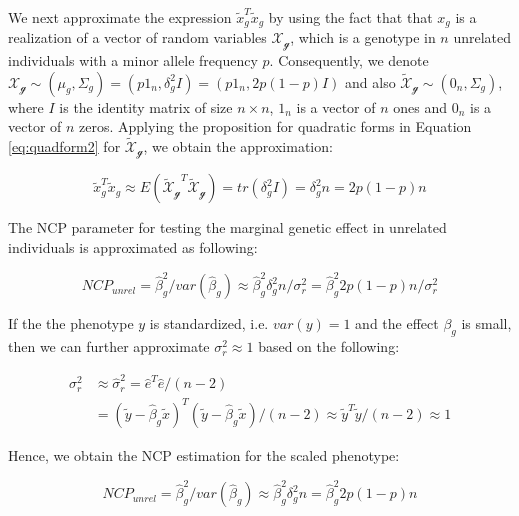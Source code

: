 \documentclass[]{book}
\theoremstyle{definition}
\theoremstyle{definition}
\theoremstyle{definition}
\theoremstyle{remark}
\begin{document}
We next approximate the expression \(\tilde{x}_g^T \tilde{x}_g\) by
using the fact that that \(x_g\) is a realization of a vector of random
variables \(\mathcal{X_g}\), which is a genotype in \(n\) unrelated
individuals with a minor allele frequency \(p\). Consequently, we denote
\(\mathcal{X_g} \sim (\mu_g, \Sigma_g) = (p 1_n, \delta_g^2 I) = (p 1_n, 2 p (1-p) I)\)
and also \(\mathcal{\tilde{X}_g} \sim (0_n, \Sigma_g)\), where \(I\) is
the identity matrix of size \(n \times n\), \(1_n\) is a vector of \(n\)
ones and \(0_n\) is a vector of \(n\) zeros. Applying the proposition
for quadratic forms in Equation \eqref{eq:quadform2} for
\(\mathcal{\tilde{X}_g}\), we obtain the approximation:

\begin{equation} 
\tilde{x}_g^T \tilde{x}_g \approx E(\mathcal{\tilde{X}_g}^T \mathcal{\tilde{X}_g}) = tr(\delta_g^2 I) = \delta_g^2 n = 2 p (1 - p) n
\label{eq:varbetahatlmg}
\end{equation}

The NCP parameter for testing the marginal genetic effect in unrelated
individuals is approximated as following:

\begin{equation} 
NCP_{unrel} = \hat{\beta}_g^2 / var(\hat{\beta}_g) \approx \hat{\beta}_g^2 \delta_g^2 n / \sigma_r^2 = \hat{\beta}_g^2 2 p (1 - p) n / \sigma_r^2
\label{eq:ncplmg}
\end{equation}

If the the phenotype \(y\) is standardized, i.e. \(var(y) = 1\) and the
effect \(\beta_g\) is small, then we can further approximate
\(\sigma_r^2 \approx 1\) based on the following:

\begin{equation} 
\begin{split}
\sigma^2_r & \approx \hat{\sigma}^2_r = \hat{e}^T \hat{e} / (n - 2) \\
& = (\tilde{y} - \hat{\beta}_g \tilde{x})^T (\tilde{y} - \hat{\beta}_g \tilde{x}) / (n - 2) \approx \tilde{y}^T \tilde{y} / (n - 2) \approx 1
\end{split}
\label{eq:sigma2r}
\end{equation}

Hence, we obtain the NCP estimation for the scaled phenotype:

\begin{equation} 
NCP_{unrel} = \hat{\beta}_g^2 / var(\hat{\beta}_g) \approx \hat{\beta}_g^2 \delta_g^2 n  = \hat{\beta}_g^2 2 p (1 - p) n
\label{eq:ncplmg}
\end{equation}
\end{document}
